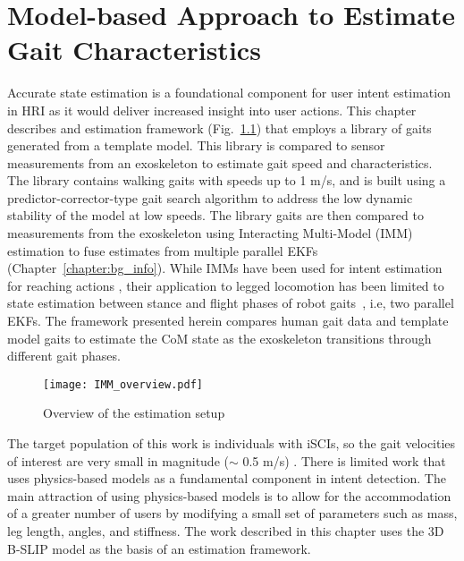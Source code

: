 \chapter{Model-based Approach to Estimate Gait Characteristics} \label{chapter:IMM}
Accurate state estimation is a foundational component for user intent estimation in HRI as it would deliver increased insight into user actions. This chapter describes and estimation framework (Fig.~\ref{fig:IMM_overview}) that employs a library of gaits generated from a template model. This library is compared to sensor measurements from an exoskeleton to estimate gait speed and characteristics. The library contains walking gaits with speeds up to 1 m/s, and is built using a predictor-corrector-type gait search algorithm to address the low dynamic stability of the model at low speeds. The library gaits are then compared to measurements from the exoskeleton using Interacting Multi-Model (IMM) estimation to fuse estimates from multiple parallel EKFs (Chapter~\ref{chapter:bg_info}). While IMMs have been used for intent estimation for reaching actions \cite{chaandar2015human}, their application to legged locomotion has been limited to state estimation between stance and flight phases of robot gaits~\cite{skaff2005context, pace2020stepping}, i.e, two parallel EKFs. The framework presented herein compares human gait data and template model gaits to estimate the CoM state as the exoskeleton transitions through different gait phases.

\begin{figure}
	\centering
	\texttt{[image: IMM\_overview.pdf]}
	\caption{Overview of the estimation setup}\label{fig:IMM_overview}
	\vspace{-1em}
\end{figure}

The target population of this work is individuals with iSCIs, so the gait velocities of interest are very small in magnitude ($ \sim $ 0.5 m/s) \cite{nymark2005electromyographic}. There is limited work that uses physics-based models as a fundamental component in intent detection. The main attraction of using physics-based models is to allow for the accommodation of a greater number of users by modifying a small set of parameters such as mass, leg length, angles, and stiffness. The work described in this chapter uses the 3D B-SLIP model \cite{liu2015dynamic} as the basis of an estimation framework.

